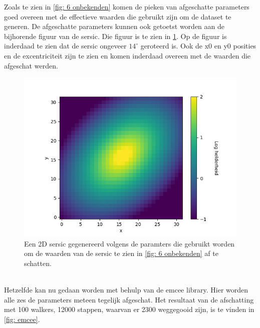 Zoals te zien in \cref{fig: 6 onbekenden} komen de pieken van afgeschatte parameters goed overeen met de effectieve waarden die gebruikt zijn om de dataset te generen. De afgeschatte parameters kunnen ook getoetst worden aan de bijhorende figuur van de sersic. Die figuur is te zien in \cref{fig: af te schatten sersic}. Op de figuur is inderdaad te zien dat de sersic ongeveer $14^{\circ}$ geroteerd is. Ook de x0 en y0 posities en de excentriciteit zijn te zien en komen inderdaad overeen met de waarden die afgeschat werden. 
\begin{figure}
    \centering
    \includegraphics[width=0.95\linewidth]{Figures/figuur_2D_zonder_package_40_5_1_0.35_0.7853981633974483.png}
    \caption{Een 2D sersic gegenereerd volgens de paramters die gebruikt worden om de waarden van de sersic te zien in \cref{fig: 6 onbekenden} af te schatten.}
    \label{fig: af te schatten sersic}
\end{figure}\mbox{}\\
Hetzelfde kan nu gedaan worden met behulp van de emcee library. Hier worden alle zes de parameters meteen tegelijk afgeschat. Het resultaat van de afschatting met 100 walkers, 12000 stappen, waarvan er 2300 weggegooid zijn, is te vinden in \cref{fig: emcee}.
